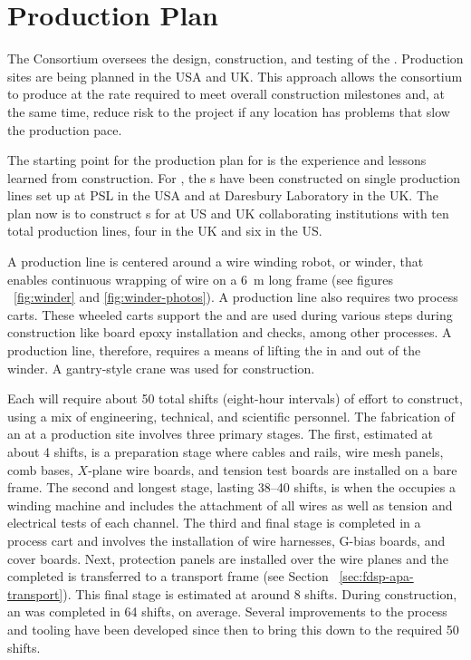 \section{Production Plan}
\label{sec:fdsp-apa-prod}

The  Consortium oversees the design, construction, and testing of the   . Production sites are being planned in the USA and UK. This approach allows the consortium to produce  at the rate required to meet overall construction milestones and, at the same time, reduce risk to the project if any location has problems that slow the production pace.

The starting point for the  production plan for   is the experience and lessons learned from  construction. For , the s have been constructed on single production lines set up at PSL in the USA and at Daresbury Laboratory in the UK.  The plan now is to construct s for  at US and UK collaborating institutions with ten total production lines, four in the UK and six in the US.  

A production line is centered around a wire winding robot, or winder, that enables continuous wrapping of wire on a \SI{6}{m} long frame (see figures ~\ref{fig:winder} and \ref{fig:winder-photos}). 
A production line also requires two process carts. These wheeled carts support the  and are used during various steps during construction like board epoxy installation and  checks, among other processes. A production line, therefore, requires a means of lifting the  in and out of the winder. A gantry-style crane was used for  construction.

Each  will require about \num{50} total shifts (eight-hour intervals) of effort to construct, using a mix of engineering, technical, and scientific personnel.  The fabrication of an  at a production site involves three primary stages. The first, estimated at about \num{4} shifts, is a preparation stage where  cables and rails, wire mesh panels, comb bases, $X$-plane wire boards, and tension test boards are installed on a bare  frame. The second and longest stage, lasting \num{38}--\num{40} shifts, is when the  occupies a winding machine and includes the attachment of all wires as well as tension and electrical tests of each channel.  The third and final stage is completed in a process cart and involves the installation of wire harnesses, G-bias boards, and cover boards. %
Next, protection panels are installed over the wire planes and the completed  is transferred to a transport frame (see Section ~\ref{sec:fdsp-apa-transport}). This final stage is estimated at around \num{8} shifts.   During  construction, an  was completed in \num{64} shifts, on average. Several improvements to the process and tooling have been developed since then to bring this down to the required \num{50} shifts. 

